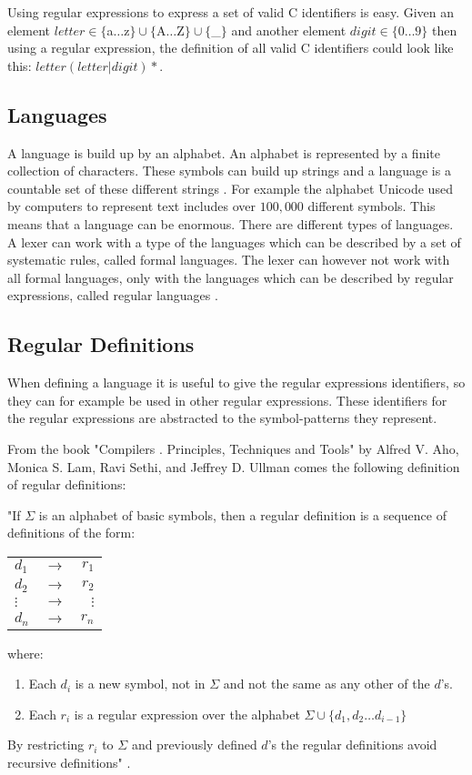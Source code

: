\begin{example}\label{regexpEx}
Using regular expressions to express a set of valid C identifiers is easy.
Given an element $letter \in \{$a$ \dots $z$\} \cup \{$A$ \dots $Z$\} \cup 
\{$\_$\}$ and another element $digit \in \{0 \dots 9\}$ then using a regular
expression, the definition of all valid C identifiers 
could look like this: $letter (letter | digit)*$. 
\end{example}

\subsection{Languages}
A language is build up by an alphabet. An alphabet is represented by a finite collection of characters. These symbols can build up strings and a language is a countable set of these different strings \cite{Aho2006}. For example the alphabet Unicode used by computers to represent text includes over $100,000$ different symbols. This means that a language can be enormous.
There are different types of languages. A lexer can work with a type of the languages which can be described by a set of systematic rules, called formal languages. The lexer can however not work with all formal languages, only with the languages which can be described by regular expressions, called regular languages \cite{Ranta2012}. 

\subsection{Regular Definitions}
When defining a language it is useful to give the regular expressions identifiers,
so they can for example be used in other regular expressions. These identifiers for the regular expressions are abstracted to the symbol-patterns they represent.

From the book "Compilers . Principles, Techniques and Tools" by Alfred V. Aho, Monica S. Lam, Ravi Sethi, and Jeffrey D. Ullman comes the following definition of regular definitions:

"If $\Sigma$ is an alphabet of
basic symbols, then a regular definition is a sequence of definitions of the
form:
\begin{center}
\begin{tabular}{l c r}
$d_1$ & $\to$ & $r_1$\\
$d_2$ & $\to$ & $r_2$\\
$\vdots$ & $\to$ & $\vdots$\\
$d_n$ & $\to$ & $r_n$\\

\end{tabular}
\end{center}
where:
\begin{enumerate}
\item Each $d_i$ is a new symbol, not in $\Sigma$ and not the same as any other
of the $d$'s.
\item Each $r_i$ is a regular expression over the alphabet $\Sigma  \cup \{d_1,
d_2 \dots d_{i-1}\}$
\end{enumerate}
By restricting $r_i$ to $\Sigma$ and previously defined $d$'s the regular
definitions avoid recursive definitions" \cite{Aho2006}.

